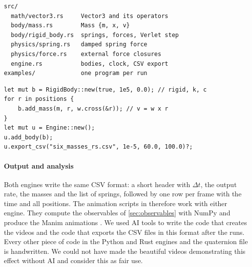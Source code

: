 \medskip\noindent\begin{minipage}{\linewidth}
\begin{verbatim}
src/
  math/vector3.rs     Vector3 and its operators
  body/mass.rs        Mass {m, x, v}
  body/rigid_body.rs  springs, forces, Verlet step
  physics/spring.rs   damped spring force
  physics/force.rs    external force closures
  engine.rs           bodies, clock, CSV export
examples/             one program per run
\end{verbatim}
\label{lst:tree}
\end{minipage}\par\medskip

\medskip\noindent\begin{minipage}{\linewidth}
\begin{verbatim}
let mut b = RigidBody::new(true, 1e5, 0.0); // rigid, k, c
for r in positions {
    b.add_mass(m, r, w.cross(&r)); // v = w x r
}
let mut u = Engine::new();
u.add_body(b);
u.export_csv("six_masses_rs.csv", 1e-5, 60.0, 100.0)?;
\end{verbatim}
\label{lst:usage}
\end{minipage}\par\medskip

\paragraph{Output and analysis}
Both engines write the same CSV format: a short header with $\Delta t$, the output rate, the masses and the list of springs, followed by one row per frame with the time and all positions.
The animation scripts in  therefore work with either engine.
They compute the observables of \cref{sec:observables} with NumPy \cite{numpy} and produce the Manim animations \cite{manim}.
We used AI tools to write the code that creates the videos and the code that exports the CSV files in this format after the runs.
Every other piece of code in the Python and Rust engines and the quaternion file is handwritten. We could not have made the beautiful videos demonstrating this effect without AI and consider this as fair use.


